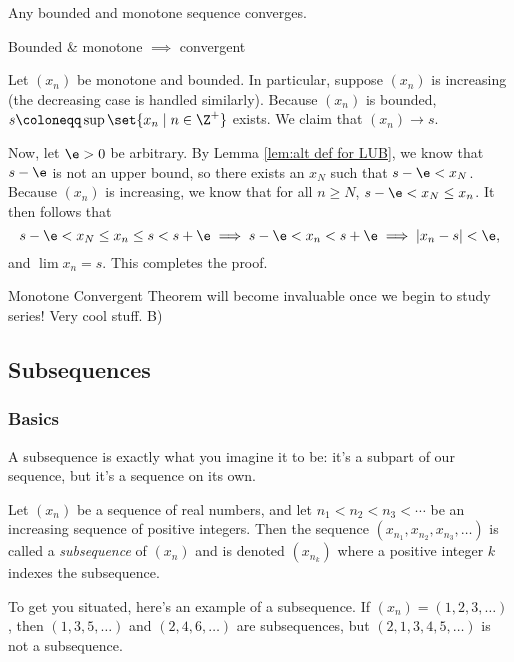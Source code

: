 \documentclass[class=article, crop=false]{standalone}
\begin{document}
\begin{thm}
    Any bounded and monotone sequence converges.
\end{thm}
\begin{slogan}
    Bounded \& monotone $\implies$ convergent
\end{slogan}

\begin{pf}
    Let $(x_n)$ be monotone and bounded. In particular, suppose $(x_n)$ is increasing (the decreasing case is handled similarly). Because $(x_n)$ is bounded, $s \coloneqq \sup \set{x_n \mid n \in \Z^+}$ exists. We claim that $(x_n) \to s$.

    Now, let $\e> 0$ be arbitrary. By Lemma \ref{lem:alt def for LUB}, we know that $s-\e$ is not an upper bound, so there exists an $x_N$ such that $s-\e < x_N$. Because $(x_n)$ is increasing, we know that for all $n \geq N$, $s-\e < x_N \leq x_n$. It then follows that
        \[
            s-\e < x_N \leq x_n \leq s < s+\e \implies s-\e < x_n < s+\e \implies |x_n-s| < \e,
        \]
    and $\lim x_n = s$. This completes the proof.
\end{pf}

Monotone Convergent Theorem will become invaluable once we begin to study series! Very cool stuff. B)

\subsection{Subsequences}

\subsubsection*{Basics}

A subsequence is exactly what you imagine it to be: it's a subpart of our sequence, but it's a sequence on its own.
\begin{defn}[Subsequence]
    Let $(x_n)$ be a sequence of real numbers, and let $n_1 < n_2 <n_3 < \cdots$ be an increasing sequence of positive integers. Then the sequence $(x_{n_1}, x_{n_2}, x_{n_3}, \ldots)$ is called a \textit{subsequence} of $(x_n)$ and is denoted $(x_{n_k})$ where a positive integer $k$ indexes the subsequence.
\end{defn}

\begin{ex}
    To get you situated, here's an example of a subsequence. If $(x_n) = (1,2,3,\ldots)$, then $(1,3,5,\ldots)$ and $(2,4,6,\ldots)$ are subsequences, but $(2,1,3,4,5,\ldots)$ is not a subsequence.
\end{ex}
\end{document}

